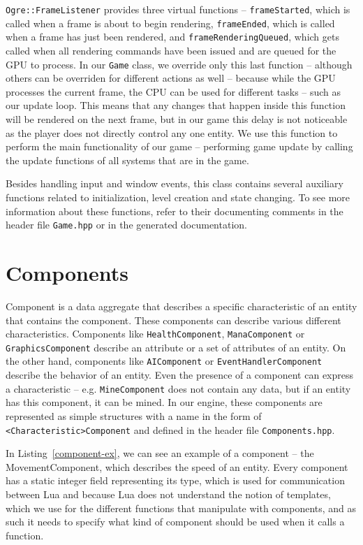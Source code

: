 \texttt{Ogre::FrameListener} provides three virtual functions -- \texttt{frameStarted}, which is called when a frame
is about to begin rendering, \texttt{frameEnded}, which is called when a frame has just been rendered, and \texttt{frameRenderingQueued},
which gets called when all rendering commands have been issued and are queued for the GPU to process. In our \texttt{Game} class, we override
only this last function -- although others can be overriden for different actions as well -- because while the GPU processes the current
frame, the CPU can be used for different tasks -- such as our update loop. This means that any changes that happen inside this function
will be rendered on the next frame, but in our game this delay is not noticeable as the player does not directly control any one entity.
We use this function to perform the main functionality of our game -- performing game update by calling the update functions of all
systems that are in the game.

Besides handling input and window events, this class contains several auxiliary functions related to initialization, level creation and
state changing. To see more information about these functions, refer to their documenting comments in the header file \texttt{Game.hpp} or
in the generated documentation.

\section{Components}

Component is a data aggregate that describes a specific characteristic of an entity that contains the component.
These components can describe various different characteristics. Components like \texttt{HealthComponent}, \texttt{ManaComponent}
or \texttt{GraphicsComponent} describe an attribute or a set of attributes of an entity. On the other hand, components like
\texttt{AIComponent} or \texttt{EventHandlerComponent} describe the behavior of an entity. Even the presence of a
component can express a characteristic -- e.g. \texttt{MineComponent} does not contain any data, but if an entity has this component, it
can be mined. In our engine, these
components are represented as simple structures with a name in the form of \texttt{<Characteristic>Component} and defined in the header file
\texttt{Components.hpp}. 

In Listing~\ref{component-ex}, we can see an example of a component -- the MovementComponent, which describes the speed of an entity.
Every component has a static integer field representing its type, which is used for communication between Lua and \cpp because Lua does not
understand the notion of templates, which we use for the different functions that manipulate with components, and as such it needs
to specify what kind of component should be used when it calls a \cpp function.

